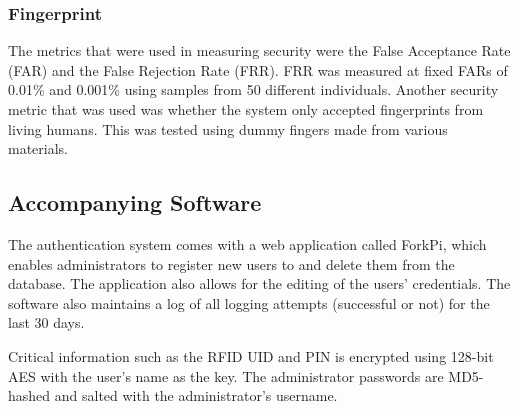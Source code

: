 \subsubsection{Fingerprint}

The metrics that were used in measuring security were the False Acceptance Rate (FAR) and the False Rejection Rate (FRR). FRR was measured at fixed FARs of 0.01\% and 0.001\% using samples from 50 different individuals. Another security metric that was used was whether the system only accepted fingerprints from living humans. This was tested using dummy fingers made from various materials.

\subsection{Accompanying Software}
The authentication system comes with a web application called ForkPi, which enables administrators to register new users to and delete them from the database. The application also allows for the editing of the users' credentials. The software also maintains a log of all logging attempts (successful or not) for the last 30 days.

Critical information such as the RFID UID and PIN is encrypted using 128-bit AES with the user's name as the key. The administrator passwords are MD5-hashed and salted with the administrator's username. 



